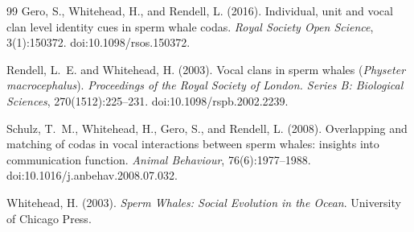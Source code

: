 \documentclass[11pt]{article}
\begin{document}
\begin{thebibliography}{99}
Gero, S., Whitehead, H., and Rendell, L. (2016).
\newblock Individual, unit and vocal clan level identity cues in sperm whale codas.
\newblock \emph{Royal Society Open Science}, 3(1):150372. doi:10.1098/rsos.150372.

Rendell, L.~E. and Whitehead, H. (2003).
\newblock Vocal clans in sperm whales (\emph{Physeter macrocephalus}).
\newblock \emph{Proceedings of the Royal Society of London. Series B: Biological Sciences}, 270(1512):225--231. doi:10.1098/rspb.2002.2239.

Schulz, T.~M., Whitehead, H., Gero, S., and Rendell, L. (2008).
\newblock Overlapping and matching of codas in vocal interactions between sperm whales: insights into communication function.
\newblock \emph{Animal Behaviour}, 76(6):1977--1988. doi:10.1016/j.anbehav.2008.07.032.

Whitehead, H. (2003).
\newblock \emph{Sperm Whales: Social Evolution in the Ocean}.
\newblock University of Chicago Press.

\end{thebibliography}
\end{document}
